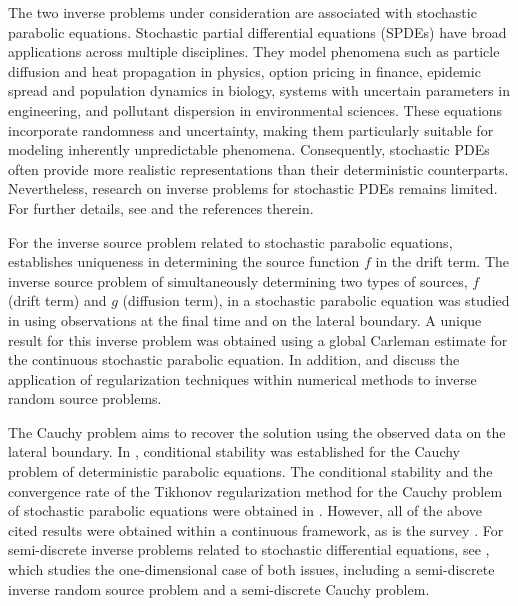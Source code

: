 \documentclass[11pt,oneside,leqno]{amsart}
\numberwithin{equation}{section}
\numberwithin{equation}{section}
\begin{document}
The two inverse problems under consideration are associated with stochastic parabolic equations. Stochastic partial differential equations (SPDEs) have broad applications across multiple disciplines. They model phenomena such as particle diffusion and heat propagation in physics, option pricing in finance, epidemic spread and population dynamics in biology, systems with uncertain parameters in engineering, and pollutant dispersion in environmental sciences. These equations incorporate randomness and uncertainty, making them particularly suitable for modeling inherently unpredictable phenomena. Consequently, stochastic PDEs often provide more realistic representations than their deterministic counterparts. Nevertheless, research on inverse problems for stochastic PDEs remains limited. For further details, see \cite[Chapter 5]{lu2021mathematical} and the references therein.

For the inverse source problem related to stochastic parabolic equations, \cite{QLu:2012} establishes uniqueness in determining the source function $f$ in the drift term. The inverse source problem of simultaneously determining two types of sources, $f$ (drift term) and $g$ (diffusion term), in a stochastic parabolic equation was studied in \cite{ref37} using observations at the final time and on the lateral boundary. A unique result for this inverse problem was obtained using a global Carleman estimate for the continuous stochastic parabolic equation. In addition, \cite{ref1} and \cite{ref2} discuss the application of regularization techniques within numerical methods to inverse random source problems.

The Cauchy problem aims to recover the solution using the observed data on the lateral boundary. In \cite{Yamamoto_2009}, conditional stability was established for the Cauchy problem of deterministic parabolic equations. The conditional stability and the convergence rate of the Tikhonov regularization method for the Cauchy problem of stochastic parabolic equations were obtained in \cite{ref13}. However, all of the above cited results were obtained within a continuous framework, as is the survey \cite{LZ:2024}. For semi-discrete inverse problems related to stochastic differential equations, see \cite{WWW:2024}, which studies the one-dimensional case of both issues, including a semi-discrete inverse random source problem and a semi-discrete Cauchy problem. 
\end{document}
